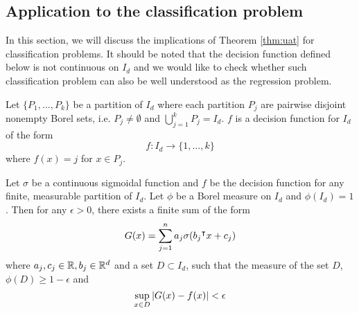


\subsection{Application to the classification problem}

In this section, we will discuss the implications of Theorem \ref{thm:uat} for
classification problems. It should be noted that the decision function defined
below is not continuous on $I_d$ and we would like to check whether such
classification problem can also be well understood as the regression problem.

\begin{definition}
    Let $\{P_1, \dots, P_k\}$ be a partition of $I_d$ where each partition $P_j$
    are pairwise disjoint nonempty Borel sets, i.e. $P_j \not= \emptyset$ and
    $\bigcup_{j=1}^k P_j = I_d$. $f$ is a decision function for $I_d$ of the
    form
    \begin{equation}
        f: I_d \to \{1, \dots, k\}
    \end{equation}
    where $f(x) = j$ for $x \in P_j$. 
\end{definition}

\begin{theorem}
    \label{thm:uat_clas}
    Let $\sigma$ be a continuous sigmoidal function and $f$ be the decision
    function for any finite, measurable partition of $I_d$. Let $\phi$ be a
    Borel measure on $I_d$ and $\phi(I_d) = 1$. Then for any $\epsilon>0$, there
    exists a finite sum of the form
    \begin{equation}
        G(x) = \sum_{j=1}^n a_j \sigma(b_j{}^{\intercal} x + c_j)
    \end{equation}
    where $a_j, c_j \in \mathbb{R}, b_j \in \mathbb{R}^d$ and a set $D\subset I_d$, such that
    the measure of the set $D$, $\phi(D) \geq 1 - \epsilon$ and
    \begin{equation}
        \sup_{x\in D}\left| G(x) - f(x) \right| < \epsilon
    \end{equation}
\end{theorem}

